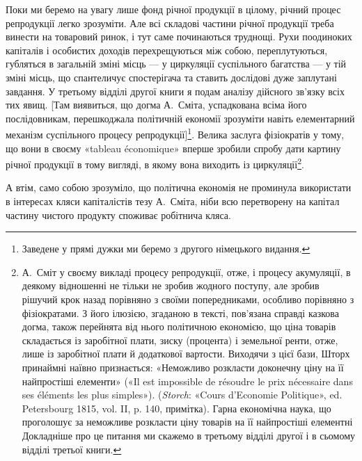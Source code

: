 Поки ми беремо на увагу лише фонд річної продукції в цілому,
річний процес репродукції легко зрозуміти. Але всі складові
частини річної продукції треба винести на товаровий ринок, і
тут саме починаються труднощі. Рухи поодиноких капіталів і
особистих доходів перехрещуються між собою, переплутуються,
губляться в загальній зміні місць — у циркуляції суспільного
багатства — у тій зміні місць, що спантеличує спостерігача та
ставить дослідові дуже заплутані завдання. У третьому відділі
другої книги я подам аналізу дійсного зв’язку всіх тих явищ.
[Там виявиться, що догма А.~Сміта, успадкована всіма його послідовникам,
перешкоджала політичній економії зрозуміти навіть
елементарний механізм суспільного процесу репродукції]\footnote*{
Заведене у прямі дужки ми беремо з другого німецького видання.
}. Велика
заслуга фізіократів у тому, що вони в своєму «tableau économique»
вперше зробили спробу дати картину річної продукції
в тому вигляді, в якому вона виходить із циркуляції\footnote{
А.~Сміт у своєму викладі процесу репродукції, отже, і процесу
акумуляції, в деякому відношенні не тільки не зробив жодного поступу,
але зробив рішучий крок назад порівняно з своїми попередниками, особливо
порівняно з фізіократами. З його ілюзією, згаданою в тексті, пов’язана
справді казкова догма, також перейнята від нього політичною економією,
що ціна товарів складається із заробітної плати, зиску (процента)
і земельної ренти, отже, лише із заробітної плати й додаткової вартости.
Виходячи з цієї бази, Шторх принаймні наївно признається: «Неможливо
розкласти доконечну ціну на її найпростіші елементи» («Il est
impossible de résoudre le prix nécessaire dans ses éléments les plus simples»).
(\emph{Storch}: «Cours d’Economie Politique», ed. Petersbourg 1815,
vol. II, p. 140, примітка). Гарна економічна наука, що проголошує за
неможливе розкласти ціну товарів на її найпростіші елементні Докладніше
про це питання ми скажемо в третьому відділі другої і в сьомому
відділі третьої книги.
}.

А втім, само собою зрозуміло, що політична економія не проминула
використати в інтересах кляси капіталістів тезу А.~Сміта,
ніби всю перетворену на капітал частину чистого продукту споживає
робітнича кляса.
